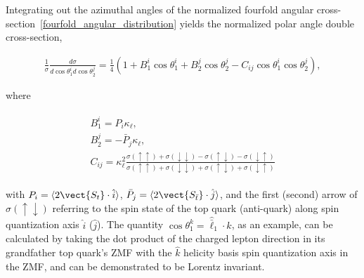 Integrating out the azimuthal angles of the normalized fourfold angular cross-section~\ref{fourfold_angular_distribution} yields the normalized polar angle double cross-section,
\begin{linenomath*}
\begin{align}
\frac{1}{\sigma} \frac{d \sigma}{d \cos \theta_1^i d \cos \theta_2^j}=\frac{1}{4}\left(1+B_1^{i} \cos \theta_1^i+B_2^{j} \cos \theta_2^j-C_{ij} \cos \theta_1^i \cos \theta_2^j\right),
\label{double_angular_distribution}
\end{align}
\end{linenomath*}
\begin{center}
where 
\end{center}
\begin{linenomath*}
\begin{align}
\begin{array}{c}
B_1^{i} = P_{i}\kappa_\ell,\\
B_2^{j} = -\bar{P}_{j}\kappa_\ell,\\
C_{ij}=\kappa_{\ell}^2 \frac{\sigma(\uparrow \uparrow)+\sigma(\downarrow \downarrow)-\sigma(\uparrow \downarrow)-\sigma(\downarrow \uparrow)}{\sigma(\uparrow \uparrow)+\sigma(\downarrow \downarrow)+\sigma(\uparrow \downarrow)+\sigma(\downarrow \uparrow)}
\end{array}
\label{Polarizations_and_Spin_Correlations}
\end{align}
\end{linenomath*}
with $P_{i} = \langle 2 \vect{S_t} \cdot \hat{i} \rangle$, $\bar{P}_{j} = \langle 2 \vect{S_{\bar{t}}} \cdot \hat{j} \rangle$, and the first (second) arrow of $\sigma(\uparrow \downarrow)$ referring to the spin state of the top quark (anti-quark) along spin quantization axis $\hat{i}$ ($\hat{j}$).
The quantity $\cos \theta_1^k = \hat{\bar{\ell}}_1 \cdot \hat{k}$, as an example, can be calculated by taking the dot product of the charged lepton direction in its grandfather top quark's ZMF with the $\hat{k}$ helicity basis spin quantization axis in the \ttbar ZMF, and can be demonstrated to be Lorentz invariant.

